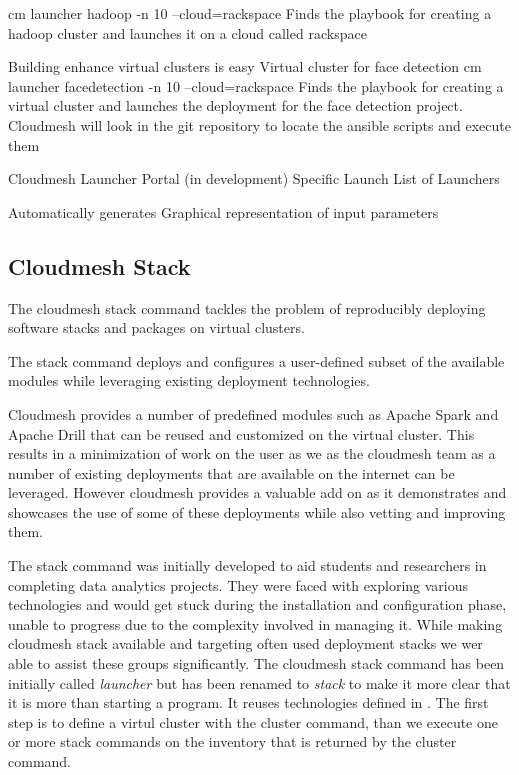 cm launcher hadoop -n 10 --cloud=rackspace
Finds the playbook for creating a hadoop cluster and launches it on a cloud called rackspace



Building enhance virtual clusters is easy
Virtual cluster for face detection
cm launcher facedetection -n 10 --cloud=rackspace
Finds the playbook for creating a virtual cluster and launches the deployment for the face detection project.
Cloudmesh will look in the git repository to locate the ansible scripts and execute them


Cloudmesh Launcher Portal (in development)
       Specific Launch                                    List of Launchers





Automatically generates Graphical representation of input parameters                                  


\subsection{Cloudmesh Stack}
\label{S:stacks}

The cloudmesh stack command tackles the problem of reproducibly
deploying software stacks and packages on virtual clusters.

The stack command deploys and configures a user-defined subset of the
available modules while leveraging existing deployment technologies.

Cloudmesh provides a number of predefined modules such as Apache Spark
and Apache Drill that can be reused and customized on the virtual
cluster. This results in a minimization of work on the user as we as
the cloudmesh team as a number of existing deployments that are
available on the internet can be leveraged. However cloudmesh provides
a valuable add on as it demonstrates and showcases the use of some of
these deployments while also vetting and improving them.


The stack command was initially developed to aid students and
researchers in completing data analytics projects.  They were faced
with exploring various technologies and would get stuck during the
installation and configuration phase, unable to progress due to the
complexity involved in managing it. While making cloudmesh stack
available and targeting often used deployment stacks we wer able to
assist these groups significantly.  The cloudmesh stack command has
been initially called {\em launcher} but has been renamed to {\em
  stack} to make it more clear that it is more than starting a
program. It reuses technologies defined in . The first step is
to define a virtul cluster with the cluster command, than we execute
one or more stack commands on the inventory that is returned by the
cluster command.


